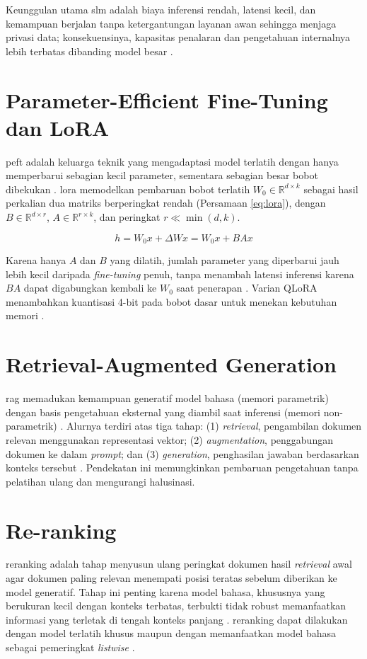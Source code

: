 Keunggulan utama \gls{slm} adalah biaya inferensi rendah, latensi kecil, dan kemampuan berjalan tanpa ketergantungan layanan awan sehingga menjaga privasi data; konsekuensinya, kapasitas penalaran dan pengetahuan internalnya lebih terbatas dibanding model besar \citep{wang2025slmsurvey}.

\section{Parameter-Efficient Fine-Tuning dan LoRA}
\gls{peft} adalah keluarga teknik yang mengadaptasi model terlatih dengan hanya memperbarui sebagian kecil parameter, sementara sebagian besar bobot dibekukan \citep{ding2023delta}. \gls{lora} \citep{hu2022lora} memodelkan pembaruan bobot terlatih $W_0 \in \mathbb{R}^{d \times k}$ sebagai hasil perkalian dua matriks berperingkat rendah (Persamaan \ref{eq:lora}), dengan $B \in \mathbb{R}^{d \times r}$, $A \in \mathbb{R}^{r \times k}$, dan peringkat $r \ll \min(d,k)$.

\begin{equation}
    h = W_0 x + \Delta W x = W_0 x + B A x
    \label{eq:lora}
\end{equation}

Karena hanya $A$ dan $B$ yang dilatih, jumlah parameter yang diperbarui jauh lebih kecil daripada \textit{fine-tuning} penuh, tanpa menambah latensi inferensi karena $BA$ dapat digabungkan kembali ke $W_0$ saat penerapan \citep{hu2022lora}. Varian QLoRA menambahkan kuantisasi 4-bit pada bobot dasar untuk menekan kebutuhan memori \citep{dettmers2023qlora}.

\section{Retrieval-Augmented Generation}
\gls{rag} memadukan kemampuan generatif model bahasa (memori parametrik) dengan basis pengetahuan eksternal yang diambil saat inferensi (memori non-parametrik) \citep{lewis2020rag}. Alurnya terdiri atas tiga tahap: (1) \textit{retrieval}, pengambilan dokumen relevan menggunakan representasi vektor; (2) \textit{augmentation}, penggabungan dokumen ke dalam \textit{prompt}; dan (3) \textit{generation}, penghasilan jawaban berdasarkan konteks tersebut \citep{gao2023ragsurvey}. Pendekatan ini memungkinkan pembaruan pengetahuan tanpa pelatihan ulang dan mengurangi halusinasi.

\section{Re-ranking}
\gls{reranking} adalah tahap menyusun ulang peringkat dokumen hasil \textit{retrieval} awal agar dokumen paling relevan menempati posisi teratas sebelum diberikan ke model generatif. Tahap ini penting karena model bahasa, khususnya yang berukuran kecil dengan konteks terbatas, terbukti tidak robust memanfaatkan informasi yang terletak di tengah konteks panjang \citep{liu2024lostmiddle}. \gls{reranking} dapat dilakukan dengan model terlatih khusus \citep{ren2021rocketqav2} maupun dengan memanfaatkan model bahasa sebagai pemeringkat \textit{listwise} \citep{sun2023rankgpt}.

